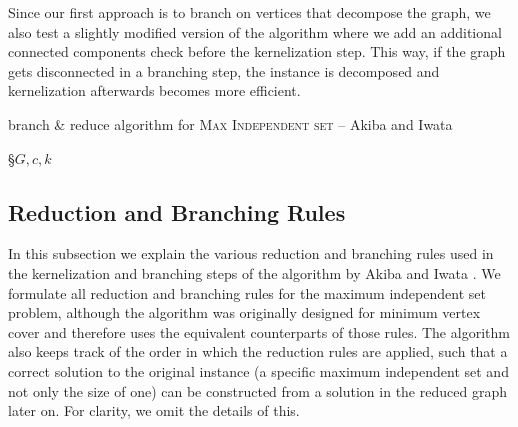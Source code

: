 \documentclass[]{article}
\begin{document}
Since our first approach is to branch on vertices that decompose the graph, we also test a slightly modified version of the algorithm where we add an additional connected components check before the kernelization step. This way, if the graph gets disconnected in a branching step, the instance is decomposed and kernelization afterwards becomes more efficient.

\begin{algorithm}
	\caption{branch \& reduce algorithm for \textsc{Max Independent set} -- Akiba and Iwata \cite{AkibaIwata}}\label{alg:bb}
	\DontPrintSemicolon
	
	\S{$G,c,k$}
	
	
\end{algorithm}
\subsection{Reduction and Branching Rules} \label{red}

In this subsection we explain the various reduction and branching rules used in the kernelization and branching steps of the algorithm by Akiba and Iwata \cite{AkibaIwata}. We formulate all reduction and branching rules for the maximum independent set problem, although the algorithm was originally designed for minimum vertex cover and therefore uses the equivalent counterparts of those rules. The algorithm also keeps track of the order in which the reduction rules are applied, such that a correct solution to the original instance (a specific maximum independent set and not only the size of one) can be constructed from a solution in the reduced graph later on. For clarity, we omit the details of this.
\end{document}
